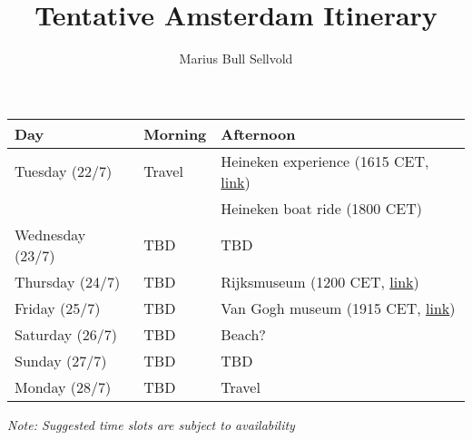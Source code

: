 \documentclass[11pt]{article}
\author{Marius Bull Sellvold}
\date{}
\title{Tentative Amsterdam Itinerary}
\begin{document}
\maketitle
\begin{center}
\begin{tabular}{lll}
\textbf{Day} & \textbf{Morning} & \textbf{Afternoon}\\[0pt]
\hline
Tuesday (22/7) & Travel & Heineken experience (1615 CET, \href{https://www.heinekenexperience.com/en/discover-our-tours/rock-the-city}{link})\\[0pt]
 &  & Heineken boat ride (1800 CET)\\[0pt]
\hline
Wednesday (23/7) & TBD & TBD\\[0pt]
\hline
Thursday (24/7) & TBD & Rijksmuseum (1200 CET, \href{https://www.rijksmuseum.nl/en}{link})\\[0pt]
\hline
Friday (25/7) & TBD & Van Gogh museum (1915 CET, \href{https://www.vangoghmuseum.nl/en}{link})\\[0pt]
\hline
Saturday (26/7) & TBD & Beach?\\[0pt]
\hline
Sunday (27/7) & TBD & TBD\\[0pt]
\hline
Monday (28/7) & TBD & Travel\\[0pt]
\end{tabular}
\end{center}

\emph{Note: Suggested time slots are subject to availability}
\end{document}

